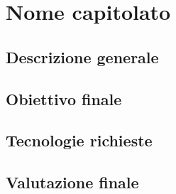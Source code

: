 \documentclass[StudioDiFattibilità.tex]{subfiles}
\begin{document}
\chapter{Nome capitolato}
\section{Descrizione generale}
\section{Obiettivo finale}
\section{Tecnologie richieste}
\section{Valutazione finale}
\end{document}
